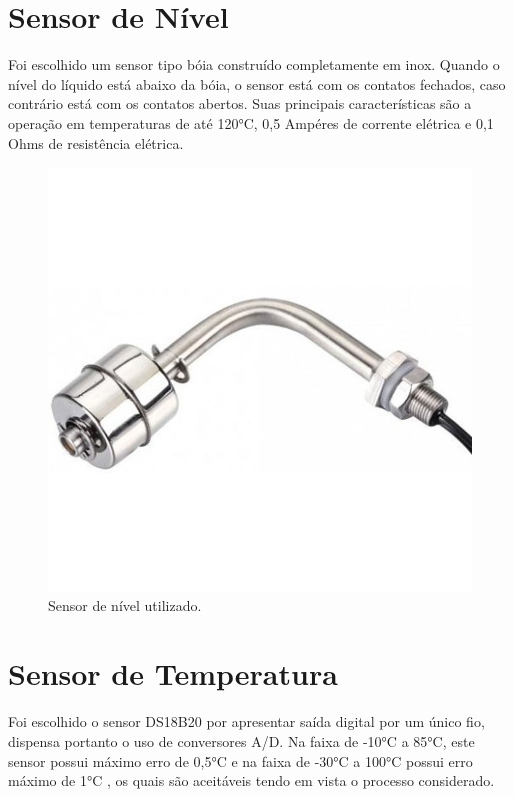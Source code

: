 		\section{Sensor de Nível}
Foi escolhido um sensor tipo bóia construído completamente em inox. Quando o nível do líquido está abaixo da bóia, o sensor está com os contatos fechados, caso contrário está com os contatos abertos. Suas principais características são a operação em temperaturas de até 120°C, 0,5 Ampéres de corrente elétrica e  0,1 Ohms de resistência elétrica.   
\begin{figure}[htb]
	\caption{\label{SensordeNivel}Sensor de nível utilizado.}
	\begin{center}
	    \includegraphics[width=0.45\linewidth]{./img/SensordeNivel.jpg}
	\end{center}
\end{figure}

		\section{Sensor de Temperatura}
Foi escolhido o sensor DS18B20 por apresentar saída digital por um único fio, dispensa portanto o uso de conversores A/D. Na faixa de -10°C a 85°C, este sensor possui máximo erro de 0,5°C e na faixa de -30°C a 100°C possui erro máximo de 1°C , os quais são aceitáveis tendo em vista o processo considerado.

